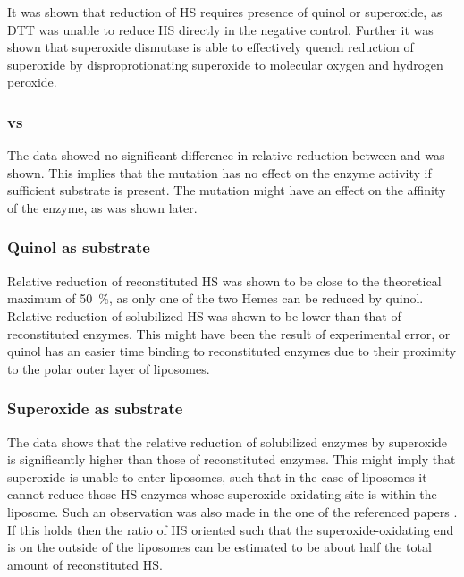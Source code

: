 It was shown that reduction of HS requires presence of quinol or superoxide, as
DTT was unable to reduce HS directly in the negative control. Further it was
shown that superoxide dismutase is able to effectively quench reduction of
superoxide by disproprotionating superoxide to molecular oxygen and hydrogen
peroxide.


\subsubsection{\hs{} vs \hsmut{}}

The data showed no significant difference in relative reduction between
\hs{} and \hsmut{} was shown. This implies that the mutation has no effect on
the enzyme activity if sufficient substrate is present. The mutation might have an
effect on the affinity of the enzyme, as was shown later.

\subsubsection{Quinol as substrate}

Relative reduction of reconstituted HS was shown to be close to the theoretical
maximum of \SI{50}{\percent}, as only one of the two Hemes can be reduced by
quinol. Relative reduction of solubilized HS was shown to be lower than that of
reconstituted enzymes. This might have been the result of experimental error,
or quinol has an easier time binding to reconstituted enzymes due to their
proximity to the polar outer layer of liposomes.

\subsubsection{Superoxide as substrate}

The data shows that the relative reduction of solubilized enzymes by superoxide
is significantly higher than those of reconstituted enzymes. This might imply
that superoxide is unable to enter liposomes, such that in the case of
liposomes it cannot reduce those HS enzymes whose superoxide-oxidating site is
within the liposome. Such an observation was also made in the one of the
referenced papers \cite{superoxide_salvaging}. If this holds then the ratio of
HS oriented such that the superoxide-oxidating end is on the outside of the
liposomes can be estimated to be about half the total amount of reconstituted
HS.

